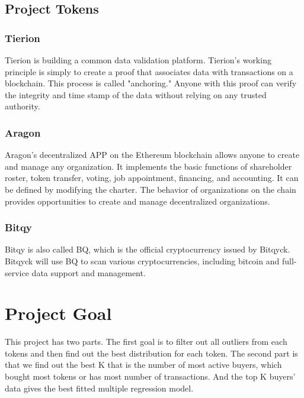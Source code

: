 \documentclass[11pt, letterpaper]{article} %
\begin{document}
\subsection{Project Tokens}  %
\subsubsection{Tierion}
Tierion is building a common data validation platform. Tierion's working principle is simply to create a proof that associates data with transactions on a blockchain. This process is called "anchoring." Anyone with this proof can verify the integrity and time stamp of the data without relying on any trusted authority.

\subsubsection{Aragon}
Aragon's decentralized APP on the Ethereum blockchain allows anyone to create and manage any organization. It implements the basic functions of shareholder roster, token transfer, voting, job appointment, financing, and accounting. It can be defined by modifying the charter. The behavior of organizations on the chain provides opportunities to create and manage decentralized organizations.

\subsubsection{Bitqy}
Bitqy is also called BQ, which is the official cryptocurrency issued by Bitqyck. Bitqyck will use BQ to scan various cryptocurrencies, including bitcoin and full-service data support and management.



\section{Project Goal}
This project has two parts. The first goal is to filter out all outliers from each tokens and then find out the best distribution for each token. The second part is that we find out the best K that is the number of most active buyers, which bought most tokens or has most number of transactions. And the top K buyers' data gives the best fitted multiple regression model.
\end{document}

